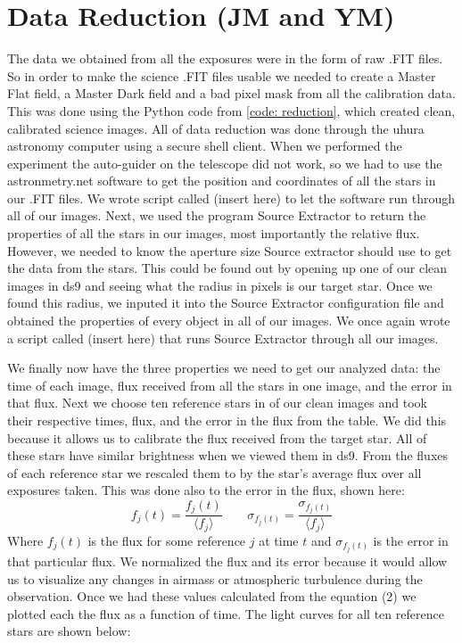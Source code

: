 \documentclass{aastex}
\begin{document}
\section{Data Reduction (JM and YM)}
The data we obtained from all the exposures were in the form of raw .FIT files. So in order to make the science .FIT files usable we needed to create a Master Flat field, a Master Dark field and a bad pixel mask from all the calibration data. This was done using the Python code from \ref{code: reduction}, which created clean, calibrated science images. All of data reduction was done through the uhura astronomy computer using a secure shell client. When we performed the experiment the auto-guider on the telescope did not work, so we had to use the astronmetry.net software to get the position and coordinates of all the stars in our .FIT files. We wrote script called (insert here) to let the software run through all of our images. Next, we used the program Source Extractor to return the properties of all the stars in our images, most importantly the relative flux. However, we needed to know the aperture size Source extractor should use to get the data from the stars. This could be found out by opening up one of our clean images in ds9 and seeing what the radius in pixels is our target star. Once we found this radius, we inputed it into the Source Extractor configuration file and obtained the properties of every object in all of our images. We once again wrote a script called (insert here) that runs Source Extractor through all our images.

We finally now have the three properties we need to get our analyzed data: the time of each image, flux received from all the stars in one image, and the error in that flux. Next we choose ten reference stars in of our clean images and took their respective times, flux, and the error in the flux from the table. We did this because it allows us to calibrate the flux received from the target star. All of these stars have similar brightness when we viewed them in ds9. From the fluxes of each reference star we rescaled them to by the star's average flux over all exposures taken. This was done also to the error in the flux, shown here:
\begin{equation}
f_{j}(t)  = \frac{f_{j}(t)}{\langle f_{j} \rangle}       \;\;\;\;\;\;\;\sigma_{f_{j}(t)} = \frac{\sigma_{f_{j}(t)}}{\langle f_{j} \rangle}
\end{equation}
Where $f_{j}(t)$ is the flux for some reference $j$ at time $t$ and $\sigma_{f_{j}(t)}$ is the error in that particular flux. We normalized the flux and its error because it would allow us to visualize any changes in airmass or atmospheric turbulence during the observation. Once we had these values calculated from the equation (2) we plotted each the flux as a function of time. The light curves for all ten reference stars are shown below:
\end{document}
